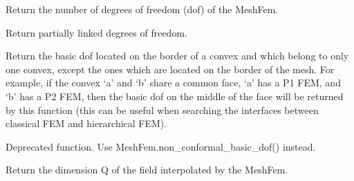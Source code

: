 \documentclass[a4paper,11pt,english]{sphinxmanual}
\begin{document}
\begin{fulllineitems}
\begin{fulllineitems}
\end{fulllineitems}


\begin{fulllineitems}
\label{\detokenize{python/cmdref_MeshFem:getfem.MeshFem.nbdof}}
Return the number of degrees of freedom (dof) of the MeshFem.

\end{fulllineitems}


\begin{fulllineitems}
\label{\detokenize{python/cmdref_MeshFem:getfem.MeshFem.non_conformal_basic_dof}}
Return partially linked degrees of freedom.

Return the basic dof located on the border of a convex and which belong
to only one convex, except the ones which are located on the border
of the mesh.  For example, if the convex ‘a’ and ‘b’ share a common
face, ‘a’ has a P1 FEM, and ‘b’ has a P2 FEM, then the basic dof on the
middle of the face will be returned by this function (this can be
useful when searching the interfaces between classical FEM and
hierarchical FEM).

\end{fulllineitems}


\begin{fulllineitems}
\label{\detokenize{python/cmdref_MeshFem:getfem.MeshFem.non_conformal_dof}}
Deprecated function. Use MeshFem.non\_conformal\_basic\_dof() instead.

\end{fulllineitems}


\begin{fulllineitems}
\label{\detokenize{python/cmdref_MeshFem:getfem.MeshFem.qdim}}
Return the dimension Q of the field interpolated by the MeshFem.


\end{fulllineitems}
\end{fulllineitems}
\end{document}
